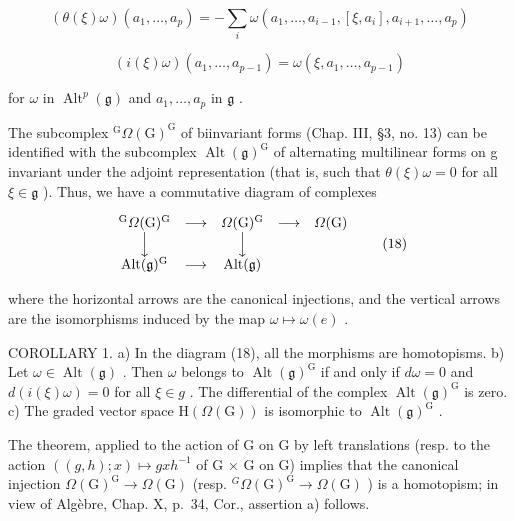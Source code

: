 \[
(\theta (\xi) \omega) (a _ {1}, \dots , a _ {p}) = - \sum_ {i} \omega (a _ {1}, \dots , a _ {i - 1}, [ \xi , a _ {i} ], a _ {i + 1}, \dots , a _ {p})
\]

\[
(i (\xi) \omega) (a _ {1}, \ldots , a _ {p - 1}) = \omega (\xi , a _ {1}, \ldots , a _ {p - 1})
\]

for \(\omega\) in \(\operatorname{Alt}^p (\mathfrak{g})\) and \(a_1,\ldots ,a_p\) in \(\mathfrak{g}\) .

The subcomplex \({}^{\mathrm{G}}\varOmega(\mathrm{G})^{\mathrm{G}}\) of biinvariant forms (Chap. III, §3, no. 13) can be identified with the subcomplex \(\operatorname{Alt}(\mathfrak{g})^{\mathrm{G}}\) of alternating multilinear forms on g invariant under the adjoint representation (that is, such that \(\theta(\xi)\omega=0\) for all \(\xi\in\mathfrak{g}\) ). Thus, we have a commutative diagram of complexes

\[
\begin{array}{c c c c c} ^ {\mathrm{G}} \varOmega (\mathrm{G}) ^ {\mathrm{G}} & \longrightarrow & \varOmega (\mathrm{G}) ^ {\mathrm{G}} & \longrightarrow & \varOmega (\mathrm{G}) \\ \Big \downarrow & & \Big \downarrow & & \\ \operatorname{Alt} (\mathfrak {g}) ^ {\mathrm{G}} & \longrightarrow & \operatorname{Alt} (\mathfrak {g}) & & \end{array}\tag{18}
\]

where the horizontal arrows are the canonical injections, and the vertical arrows are the isomorphisms induced by the map \(\omega\mapsto\omega(e)\) .

COROLLARY 1. a) In the diagram (18), all the morphisms are homotopisms. b) Let \(\omega \in \operatorname{Alt}(\mathfrak{g})\) . Then \(\omega\) belongs to \(\operatorname{Alt}(\mathfrak{g})^{\mathrm{G}}\) if and only if \(d\omega = 0\) and \(d(i(\xi)\omega) = 0\) for all \(\xi \in g\) . The differential of the complex \(\operatorname{Alt}(\mathfrak{g})^{\mathrm{G}}\) is zero. c) The graded vector space \(\mathrm{H}(\Omega(\mathrm{G}))\) is isomorphic to \(\operatorname{Alt}(\mathfrak{g})^{\mathrm{G}}\) .

The theorem, applied to the action of G on G by left translations (resp. to the action \(((g,h);x)\mapsto gxh^{-1}\) of G × G on G) implies that the canonical injection \(\Omega(\mathrm{G})^{\mathrm{G}}\to\Omega(\mathrm{G})\) (resp. \({}^{G}\Omega(\mathrm{G})^{\mathrm{G}}\to\Omega(\mathrm{G})\) ) is a homotopism; in view of Algèbre, Chap. X, p.~34, Cor., assertion a) follows.

